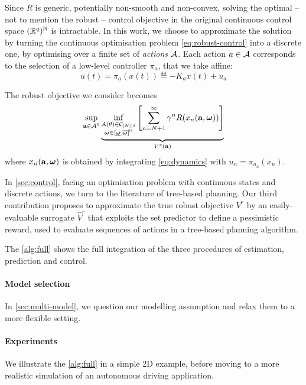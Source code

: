 \documentclass{article}
\begin{document}
Since $R$ is generic, potentially non-smooth and non-convex, solving the optimal -- not to mention the robust -- control objective in the original continuous control space $(\mathbb{R}^q)^{\mathbb{N}}$ is intractable.
In this work, we choose to approximate the solution by turning the continuous optimisation problem \eqref{eq:robust-control} into a discrete one, by optimising over a finite set of \emph{actions} $\mathcal{A}$. Each action $a\in\mathcal{A}$ corresponds to the selection of a low-level controller $\pi_a$, that we take affine:
\[u(t) = \pi_a(x(t)) \eqdef -K_a x(t) + u_a\]

The robust objective we consider becomes 
\begin{equation}
\label{eq:robust-control-disc}
\sup_{\mathbf{a}\in{\mathcal{A}}^{\mathbb{N}}} \underbrace{\inf_{\substack{A(\theta) \in \mathcal{C}_{[N],\delta} \\ \bm{\omega}\in[\underline{\bm{\omega}},\overline{\bm{\omega}}]^{\mathbb{N}}}} \left[\sum_{n=N+1}^\infty \gamma^n R(x_n(\mathbf{a},\bm{\omega}))\right]}_{V^r(\mathbf{a})}
\end{equation}
where $x_n(\mathbf{a}, \bm{\omega})$ is obtained by integrating \eqref{eq:dynamics} with $u_n = \pi_{a_n}(x_n)$.

In \autoref{sec:control}, facing an optimisation problem with continuous states and discrete actions, we turn to the literature of tree-based planning. Our third contribution proposes to approximate the true robust objective ${V}^r$ by an easily-evaluable surrogate $\hat{V}^r$ that exploits the set predictor to define a pessimistic reward, used to evaluate sequences of actions in a tree-based planning algorithm.

The \autoref{alg:full} shows the full integration of the three procedures of estimation, prediction and control.

\paragraph{Model selection} In \autoref{sec:multi-model}, we question our modelling assumption and relax them to a more flexible setting. 

\paragraph{Experiments} We illustrate the \autoref{alg:full} in a simple 2D example, before moving to a more realistic simulation of an autonomous driving application.
\end{document}
